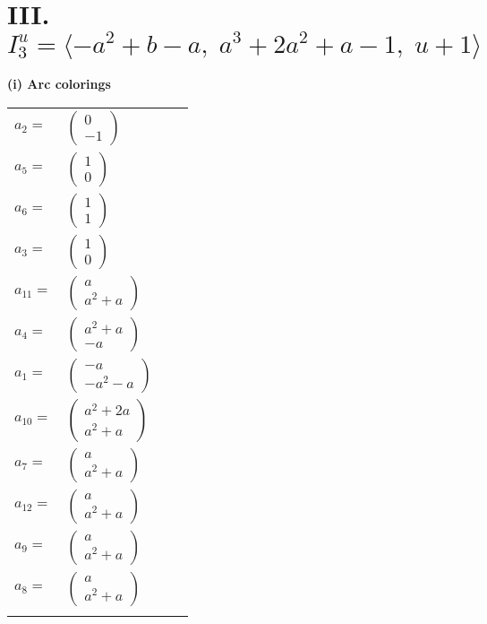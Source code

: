 \documentclass[1p]{elsarticle_modified}
\theoremstyle{definition}
\begin{document}
\centering \section*{III. $I^u_{3}= \langle - a^2+b- a,\;a^3+2 a^2+a-1,\;u+1 \rangle$}
\flushleft \textbf{(i) Arc colorings}\\
\begin{tabular}{m{7pt} m{180pt} m{7pt} m{180pt} }
\flushright $a_{2}=$&$\begin{pmatrix}0\\-1\end{pmatrix}$ \\
\flushright $a_{5}=$&$\begin{pmatrix}1\\0\end{pmatrix}$ \\
\flushright $a_{6}=$&$\begin{pmatrix}1\\1\end{pmatrix}$ \\
\flushright $a_{3}=$&$\begin{pmatrix}1\\0\end{pmatrix}$ \\
\flushright $a_{11}=$&$\begin{pmatrix}a\\a^2+a\end{pmatrix}$ \\
\flushright $a_{4}=$&$\begin{pmatrix}a^2+a\\- a\end{pmatrix}$ \\
\flushright $a_{1}=$&$\begin{pmatrix}- a\\- a^2- a\end{pmatrix}$ \\
\flushright $a_{10}=$&$\begin{pmatrix}a^2+2 a\\a^2+a\end{pmatrix}$ \\
\flushright $a_{7}=$&$\begin{pmatrix}a\\a^2+a\end{pmatrix}$ \\
\flushright $a_{12}=$&$\begin{pmatrix}a\\a^2+a\end{pmatrix}$ \\
\flushright $a_{9}=$&$\begin{pmatrix}a\\a^2+a\end{pmatrix}$ \\
\flushright $a_{8}=$&$\begin{pmatrix}a\\a^2+a\end{pmatrix}$\\&\end{tabular}
\end{document}
